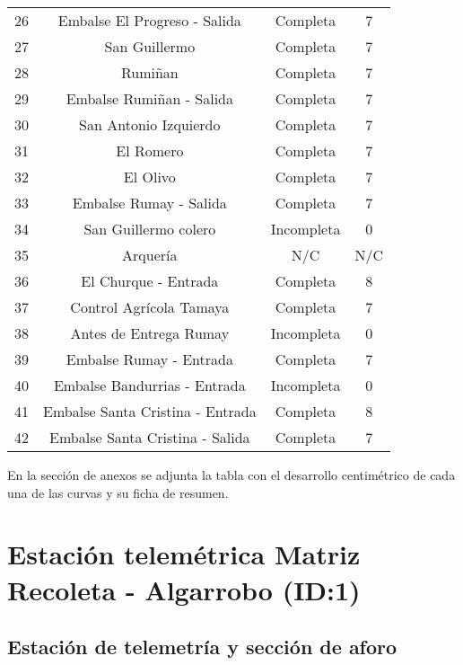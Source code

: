 \documentclass[]{article}
\begin{document}
\begin{table}[H]
\begin{tabu} {cccc}
   26 & Embalse El Progreso - Salida & Completa & 7\\
   27 & San Guillermo & Completa & 7\\
   28 & Rumiñan & Completa & 7\\
   29 & Embalse Rumiñan - Salida & Completa & 7\\
   30 & San Antonio Izquierdo & Completa & 7\\
   31 & El Romero & Completa & 7\\
   32 & El Olivo   & Completa & 7\\
   33 & Embalse Rumay - Salida & Completa & 7\\
   34 & San Guillermo colero & Incompleta & 0\\
   35 & Arquería & N/C & N/C\\
   36 & El Churque - Entrada & Completa & 8\\
   37 & Control Agrícola Tamaya & Completa & 7\\
   38 & Antes de Entrega Rumay & Incompleta & 0\\
   39 & Embalse Rumay - Entrada & Completa & 7\\
   40 & Embalse Bandurrias - Entrada & Incompleta & 0\\
   41 & Embalse Santa Cristina - Entrada & Completa & 8\\
   42 & Embalse Santa Cristina - Salida & Completa & 7\\
   
   \hline 
 \end{tabu}
\end{table}

En la sección de anexos se adjunta la tabla con el desarrollo
centimétrico de cada una de las curvas y su ficha de resumen.

\clearpage
\section{Estación telemétrica Matriz Recoleta - Algarrobo (ID:1)}

\subsection{Estación de telemetría y sección de aforo}
\end{document}
